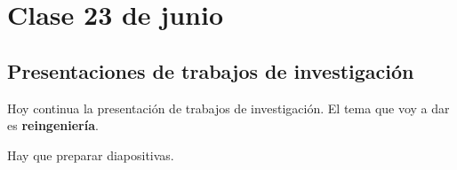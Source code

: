 \section{Clase 23 de junio}

\subsection{Presentaciones de trabajos de investigación}

Hoy continua la presentación de trabajos de investigación.
El tema que voy a dar es \textbf{reingeniería}.

Hay que preparar diapositivas.